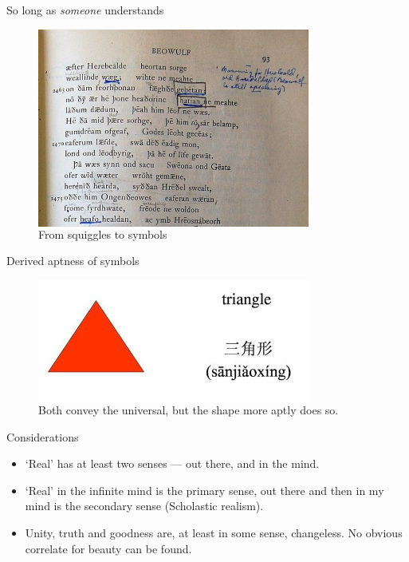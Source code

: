 \documentclass[xcolor=dvipsnames]{beamer}
\begin{document}
\begin{frame}{So long as \emph{someone} understands}
\begin{figure}
  \centering
  \begin{columns}
    \centering
    \includegraphics[width=0.8\textwidth]{beowulf}
    \caption {From squiggles to symbols}
  \end{columns}
\end{figure}
\end{frame}


\begin{frame}{Derived aptness of symbols}
\begin{figure}
  \centering
  \begin{columns}
    \centering
    \includegraphics[width=0.8\textwidth]{triangle-chinese}
    \caption {Both convey the universal, but the shape more aptly does so.}
  \end{columns}
\end{figure}
\end{frame}


\begin{frame}[fragile]{Considerations}
  \begin{itemize}
  \item `Real' has at least two senses --- out there, and in the mind.\vspace{5mm}
  \item `Real' in the infinite mind is the primary sense, out there and then in my mind is the secondary sense (Scholastic realism).\vspace{5mm}
    \item Unity, truth and goodness are, at least in some sense, changeless. No obvious correlate for beauty can be found.
  \end{itemize}
\end{frame}


\begin{frame}[plain]
  \titlepage
\end{frame}
\end{document}
